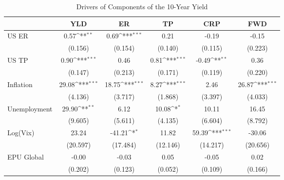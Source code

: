 \begin{table}[htbp]\centering
\def\sym#1{\ifmmode^{#1}\else\(^{#1}\)\fi}
\caption{Drivers of Components of the 10-Year Yield}
\label{tab:ycdcmp}
\begin{tabular*}{0.8\hsize}{@{\hskip\tabcolsep\extracolsep\fill}l*{5}{c}}
\toprule
                    &\multicolumn{1}{c}{YLD}&\multicolumn{1}{c}{ER}&\multicolumn{1}{c}{TP}&\multicolumn{1}{c}{CRP}&\multicolumn{1}{c}{FWD}\\
\midrule
US ER               &        0.57\sym{**} &        0.69\sym{***}&        0.21         &       -0.19         &       -0.15         \\
                    &     (0.156)         &     (0.154)         &     (0.140)         &     (0.115)         &     (0.223)         \\
\addlinespace
US TP               &        0.90\sym{***}&        0.46         &        0.81\sym{***}&       -0.49\sym{**} &        0.36         \\
                    &     (0.147)         &     (0.213)         &     (0.171)         &     (0.119)         &     (0.220)         \\
\addlinespace
Inflation           &       29.08\sym{***}&       18.75\sym{***}&        8.27\sym{***}&        2.46         &       26.87\sym{***}\\
                    &     (4.136)         &     (3.717)         &     (1.868)         &     (3.397)         &     (4.033)         \\
\addlinespace
Unemployment        &       29.90\sym{**} &        6.12         &       10.08\sym{*}  &       10.11         &       16.45         \\
                    &     (9.605)         &     (5.611)         &     (4.135)         &     (6.604)         &     (8.792)         \\
\addlinespace
Log(Vix)            &       23.24         &      -41.21\sym{*}  &       11.82         &       59.39\sym{***}&      -30.06         \\
                    &    (20.597)         &    (17.484)         &    (12.146)         &    (14.217)         &    (20.656)         \\
\addlinespace
EPU Global          &       -0.00         &       -0.03         &        0.05         &       -0.05         &        0.02         \\
                    &     (0.202)         &     (0.123)         &     (0.052)         &     (0.109)         &     (0.166)         \\

\end{tabular*}
\end{table}

